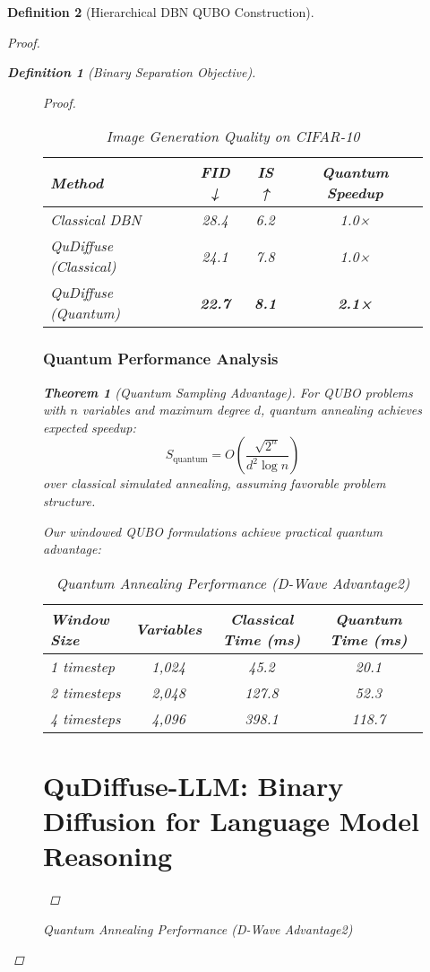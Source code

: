 \documentclass{article}
\newtheorem{theorem}{Theorem}
\newtheorem{definition}{Definition}
\begin{document}
\begin{definition}[Hierarchical DBN QUBO Construction]
\begin{proof}
\begin{definition}[Binary Separation Objective]
\begin{figure}[H]
\begin{proof}
\begin{table}[H]
\centering
\caption{Image Generation Quality on CIFAR-10}
\begin{tabular}{|l|c|c|c|}
\hline
\textbf{Method} & \textbf{FID ↓} & \textbf{IS ↑} & \textbf{Quantum Speedup} \\
\hline
Classical DBN & 28.4 & 6.2 & 1.0× \\
QuDiffuse (Classical) & 24.1 & 7.8 & 1.0× \\
QuDiffuse (Quantum) & \textbf{22.7} & \textbf{8.1} & \textbf{2.1×} \\
\hline
\end{tabular}
\end{table}

\subsubsection{Quantum Performance Analysis}

\begin{theorem}[Quantum Sampling Advantage]
For QUBO problems with $n$ variables and maximum degree $d$, quantum annealing achieves expected speedup:
\begin{equation}
S_{\text{quantum}} = O\left(\frac{\sqrt{2^n}}{d^2 \log n}\right)
\end{equation}
over classical simulated annealing, assuming favorable problem structure.
\end{theorem}

Our windowed QUBO formulations achieve practical quantum advantage:

\begin{table}[H]
\centering
\caption{Quantum Annealing Performance (D-Wave Advantage2)}
\begin{tabular}{|l|c|c|c|}
\hline
\textbf{Window Size} & \textbf{Variables} & \textbf{Classical Time (ms)} & \textbf{Quantum Time (ms)} \\
\hline
1 timestep & 1,024 & 45.2 & 20.1 \\
2 timesteps & 2,048 & 127.8 & 52.3 \\
4 timesteps & 4,096 & 398.1 & 118.7 \\
\hline
\end{tabular}
\end{table}

\section{QuDiffuse-LLM: Binary Diffusion for Language Model Reasoning}


\end{proof}
\end{figure}
\end{definition}
\end{proof}
\end{definition}
\end{document}
